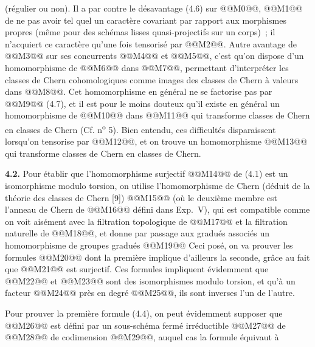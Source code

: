 
(régulier ou non). Il a par contre le désavantage (4.6) sur @@M0@@, @@M1@@ de ne pas avoir tel quel un caractère covariant par rapport aux morphismes propres (même pour des schémas lisses quasi-projectifs sur un corps)~; il n'acquiert ce caractère qu'une fois tensorisé par @@M2@@. Autre avantage de @@M3@@ sur ses concurrents @@M4@@ et @@M5@@, c'est qu'on dispose d'un homomorphisme de @@M6@@ dans @@M7@@, permettant d'interpréter les classes de Chern cohomologiques comme images des classes de Chern à valeurs dans @@M8@@. Cet homomorphisme en général ne se factorise pas par @@M9@@ (4.7), et il est pour le moins douteux qu'il existe en général un homomorphisme de @@M10@@ dans @@M11@@ qui transforme classes de Chern en classes de Chern (Cf. n\textsuperscript{o} 5). Bien entendu, ces difficultés disparaissent lorsqu'on tensorise par @@M12@@, et on trouve un homomorphisme
@@M13@@
qui transforme classes de Chern en classes de Chern.

\textbf{4.2.} Pour établir que l'homomorphisme surjectif @@M14@@ de (4.1) est un isomorphisme modulo torsion, on utilise l'homomorphisme de Chern (déduit de la théorie des classes de Chern [9])
@@M15@@
(où le deuxième membre est l'anneau de Chern de @@M16@@ défini dans Exp.~V), qui est compatible comme on voit aisément avec la filtration topologique de @@M17@@ et la filtration naturelle de @@M18@@, et donne par passage aux gradués associés un homomorphisme de groupes gradués
@@M19@@
Ceci posé, on va prouver les formules
@@M20@@
dont la première implique d'ailleurs la seconde, grâce au fait que @@M21@@ est surjectif. Ces formules impliquent évidemment que @@M22@@ et @@M23@@ sont des isomorphismes modulo torsion, et qu'à un facteur @@M24@@ près en degré @@M25@@, ils sont inverses l'un de l'autre.

Pour prouver la première formule (4.4), on peut évidemment supposer que @@M26@@ est défini par un sous-schéma fermé irréductible @@M27@@ de @@M28@@ de codimension @@M29@@, auquel cas la formule équivaut à
